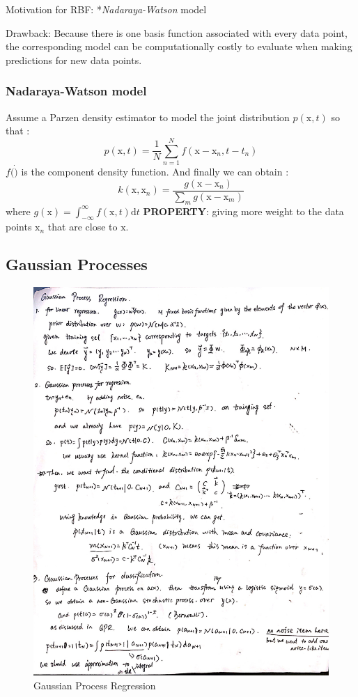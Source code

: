 \documentclass[a4paper]{book}
\begin{document}
Motivation for RBF:   *\emph{Nadaraya-Watson} model

Drawback: Because there is one basis function associated with every data point, the corresponding model can be computationally costly to evaluate when making predictions for new data points.
\subsubsection{ Nadaraya-Watson model}
Assume a Parzen density estimator to model the joint distribution $p(\mathrm x, t) $ so that :
\begin{equation}
p(\mathrm x,t) = \frac1N\sum_{n=1}^{N}f(\mathrm x-\mathrm x_n,t-t_n)
\end{equation}
$f(\dot)$ is the component density function. And finally we can obtain :
\begin{equation}
k(\mathrm x,\mathrm x_n) = \frac{g(\mathrm x-\mathrm x_n)}{\sum_mg(\mathrm x-\mathrm x_m)}
\end{equation}
where $g(\mathrm x) = \int_{-\infty}^{\infty}f(\mathrm x,t)\mathrm dt$
\textbf{PROPERTY}:  giving more weight to the data points $\mathrm x_n$ that are close to $\mathrm x$.
\subsection{Gaussian Processes}
\begin{figure}
  \centering
  \includegraphics[width=\textwidth]{./imgs/GPR.jpg}
  \caption{Gaussian Process Regression}\label{fig3.5.1}
\end{figure}
\end{document}
